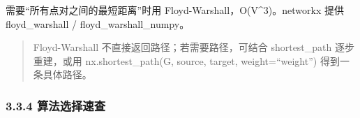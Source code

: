 需要``所有点对之间的最短距离''时用 Floyd-Warshall，O(V\^{}3)。networkx
提供 floyd\_warshall / floyd\_warshall\_numpy。

\begin{Shaded}
\begin{Highlighting}[]
\OperatorTok{=}\OperatorTok{=}\NormalTok{)}
\NormalTok{(}
\OperatorTok{=} 
\OperatorTok{=}\NormalTok{)}\OperatorTok{;}\OperatorTok{=}\NormalTok{)}
\NormalTok{(}
\NormalTok{(}
\end{Highlighting}
\end{Shaded}

\begin{Shaded}
\begin{Highlighting}[]
\end{Highlighting}
\end{Shaded}

\begin{quote}
Floyd-Warshall 不直接返回路径；若需要路径，可结合 shortest\_path
逐步重建，或用 nx.shortest\_path(G, source, target, weight=``weight'')
得到一条具体路径。
\end{quote}

\subsubsection{3.3.4
算法选择速查}\label{ux7b97ux6cd5ux9009ux62e9ux901fux67e5}

